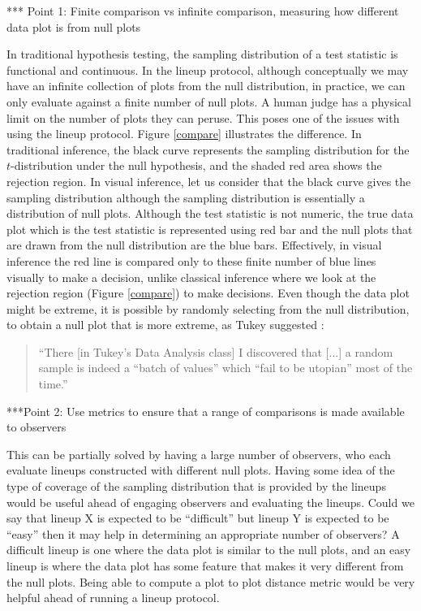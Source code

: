 \documentclass[12]{article}
\begin{document}
{\color{red}***  Point 1: Finite comparison vs infinite comparison, measuring how different data plot is from null plots}

In traditional hypothesis testing, the sampling distribution of a test statistic is functional and continuous. In the lineup protocol, although conceptually we may have an infinite collection of plots from the null distribution, in practice, we can only evaluate against a finite number of null plots. A human judge has a physical limit on the number of plots they can peruse. This poses one of the issues with using the lineup protocol.  Figure \ref{compare} illustrates the difference. In traditional inference, the black curve represents the sampling distribution for the $t$-distribution under the null hypothesis, and the shaded red area shows the rejection region. In visual inference, let us consider that the black curve gives the sampling distribution although the sampling distribution is essentially a distribution of null plots. Although the test statistic is not numeric, the true data plot which is the test statistic is represented using red bar and the null plots that are drawn from the null distribution are the blue bars. %
Effectively,  in visual inference the red line is compared only to these finite number of blue lines visually to make a decision, unlike classical inference where we look at the rejection region (Figure \ref{compare}) to make decisions. Even though the data plot might be extreme, it is possible by randomly selecting from the null distribution, to obtain a null plot that is more extreme, as Tukey suggested \citep{fernholz03}:

\begin{quotation}
``There [in Tukey's Data Analysis class] I discovered that [...]  a random sample is indeed a ``batch of values'' which ``fail to be utopian'' most of the time.''
\end{quotation}


{\color{red}***Point 2: Use metrics to ensure that a range of comparisons is made available to observers}

This can be partially solved by having a large number of observers, who each evaluate lineups constructed with different null plots. Having some idea of the type of coverage of the sampling distribution that is provided by the lineups would be useful ahead of engaging observers and evaluating the lineups. Could we say that lineup X is expected to be ``difficult'' but lineup Y is expected to be ``easy'' then it may help in determining an appropriate number of observers? A difficult lineup is one where the data plot is similar to the null plots, and an easy lineup is where the data plot has some feature that makes it very different from the null plots. Being able to compute a plot to plot distance metric would be very helpful ahead of running a lineup protocol.
\end{document}
